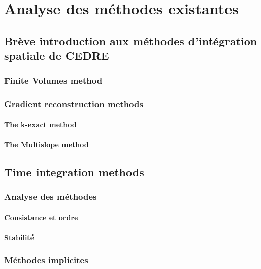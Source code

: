 


\maketitle
\tableofcontents
{}
\pagebreak




\chapter{Analyse des méthodes existantes}
  \section{Brève introduction aux méthodes d'intégration spatiale de CEDRE}
    \subsection{Finite Volumes method}
    \subsection{Gradient reconstruction methods}
      \subsubsection{The k-exact method}
      \subsubsection{The Multislope method}
  \section{Time integration methods}
    \subsection{Analyse des méthodes}
      \subsubsection{Consistance et ordre}
      \subsubsection{Stabilité}
    \subsection{Méthodes implicites}
